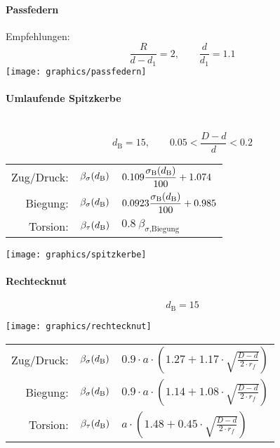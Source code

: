 		\paragraph{Passfedern}
		Empfehlungen:
		\begin{equation*}
			\frac{R}{d-d_1} = 2, \qquad \frac{d}{d_1}=1.1
		\end{equation*}
		\texttt{[image: graphics/passfedern]}
		
		\paragraph{Umlaufende Spitzkerbe}~\\
		\begin{equation*}
			d_{\text{B}}=15, \qquad 0.05<\frac{D-d}{d}<0.2
		\end{equation*}
		\begin{tabular}{rr@{$\:=\:$}l}
			Zug/Druck: & $\beta_\sigma (d_\text B)$ & $\displaystyle 0.109 \frac{\sigma_\text{B}(d_\text B)}{100} + 1.074$ \\[2ex]
			Biegung: & $\beta_\sigma (d_\text B)$ & $\displaystyle 0.0923 \frac{\sigma_\text{B}(d_\text B)}{100}+0.985$ \\[2ex]
			Torsion: & $\beta_\tau (d_\text B)$ & $0.8 \: \beta_{\sigma\text{,Biegung}}$
		\end{tabular}
		
		\begin{center}
			\texttt{[image: graphics/spitzkerbe]}
		\end{center}
		
		\paragraph{Rechtecknut}
		\begin{equation*}
			d_{\text{B}}= 15
		\end{equation*}
		\begin{center}
			\texttt{[image: graphics/rechtecknut]}
		\end{center}
		
		\begin{tabular}{rr@{$\:=\:$}l}
			Zug/Druck: & $\beta_\sigma (d_\text B)$ & $0.9 \cdot a \cdot \left( 1.27 + 1.17\cdot \sqrt{\frac{D-d}{2\cdot r_f}}\right)$ \\[2ex]
			Biegung: & $\beta_\sigma (d_\text B)$ & $0.9 \cdot a \cdot \left( 1.14 + 1.08\cdot \sqrt{\frac{D-d}{2\cdot r_f}}\right)$ \\[2ex]
			Torsion: & $\beta_\tau (d_\text B)$ & $a \cdot \left( 1.48 + 0.45\cdot \sqrt{\frac{D-d}{2\cdot r_f}}\right)$
		\end{tabular}
		
